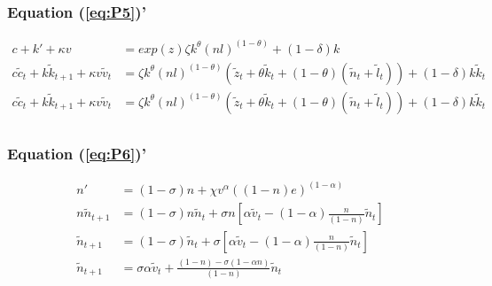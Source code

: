 \documentclass[english]{article}
\begin{document}
\subsubsection{Equation (\ref{eq:P5})'}
\begin{align*}
  c+k'+\kappa v&=exp(z)\zeta k^{\theta}(nl)^{(1-\theta)}+(1-\delta)k\\
  c\widetilde{c}_{t}+k\widetilde{k}_{t+1}+\kappa v\widetilde{v}_{t}&=\zeta k^{\theta}(nl)^{(1-\theta)}\left(\widetilde{z}_{t}+\theta\widetilde{k}_{t}+(1-\theta)(\widetilde{n}_{t}+\widetilde{l}_{t})\right)+(1-\delta)k\widetilde{k}_{t}\\
c\widetilde{c}_{t}+k\widetilde{k}_{t+1}+\kappa v\widetilde{v}_{t}&=\zeta k^{\theta}(nl)^{(1-\theta)}\left(\widetilde{z}_{t}+\theta\widetilde{k}_{t}+(1-\theta)(\widetilde{n}_{t}+\widetilde{l}_{t})\right)+(1-\delta)k\widetilde{k}_{t}\\
\end{align*}

\subsubsection{Equation (\ref{eq:P6})'}
\begin{align*}
  n'&=(1-\sigma)n+\chi v^{\alpha}((1-n)e)^{(1-\alpha)} \\
  n\widetilde{n}_{t+1}&=(1-\sigma)n\widetilde{n}_{t}+\sigma n\left[\alpha\widetilde{v}_{t}-(1-\alpha)\frac{n}{(1-n)}\widetilde{n}_{t}\right]\\
  \widetilde{n}_{t+1}&=(1-\sigma)\widetilde{n}_{t}+\sigma\left[\alpha\widetilde{v}_{t}-(1-\alpha)\frac{n}{(1-n)}\widetilde{n}_{t}\right] \\
  \widetilde{n}_{t+1}&=\sigma\alpha\widetilde{v}_{t}+\frac{(1-n)-\sigma(1-\alpha n)}{(1-n)}\widetilde{n}_{t}\\
\end{align*}
\end{document}
